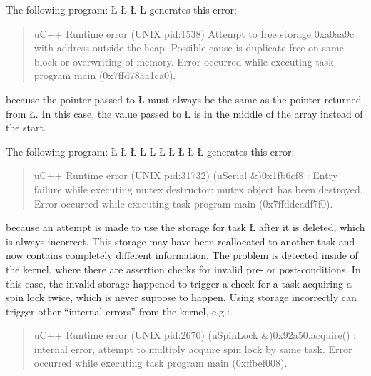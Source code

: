 \documentclass[openright,twoside]{report}
\begin{document}
The following program:
\LGinlinefalse\LGbegin\lgrinde
\L{}
\L{\LB{}}
\L{\LB{}}
\CE{}\L{\LB{\}}}
\endlgrinde\LGend
generates this error:
\begin{quote}
\BGfont
uC++ Runtime error (UNIX pid:1538) Attempt to free storage 0xa0aa9c with address outside the heap.
Possible cause is duplicate free on same block or overwriting of memory.
Error occurred while executing task program main (0x7ffd78aa1ca0).
\end{quote}
because the pointer passed to \LGinlinetrue\LGbegin\lgrinde\L{}\endlgrinde\LGend{} must always be the same as the pointer returned from \LGinlinetrue\LGbegin\lgrinde\L{}\endlgrinde\LGend{}.
In this case, the value passed to \LGinlinetrue\LGbegin\lgrinde\L{}\endlgrinde\LGend{} is in the middle of the array instead of the start.

The following program:
\LGinlinefalse\LGbegin\lgrinde
\L{}
\L{\LB{}}
\L{}
\L{\LB{}}
\L{\LB{\};}}
\L{}
\L{\LB{}}
\L{\LB{}}
\L{\LB{}}
\CE{}\L{\LB{\}}}
\endlgrinde\LGend
generates this error:
\begin{quote}
\BGfont
uC++ Runtime error (UNIX pid:31732) (uSerial \&)0x1fb6cf8 : Entry failure while executing mutex destructor: mutex object has been destroyed.
Error occurred while executing task program main (0x7ffddcadf7f0).
\end{quote}
because an attempt is made to use the storage for task \LGinlinetrue\LGbegin\lgrinde\L{}\endlgrinde\LGend{} after it is deleted, which is always incorrect.
This storage may have been reallocated to another task and now contains completely different information.
The problem is detected inside of the \uC kernel, where there are assertion checks for invalid pre- or post-conditions.
In this case, the invalid storage happened to trigger a check for a task acquiring a spin lock twice, which is never suppose to happen.
Using storage incorrectly can trigger other ``internal errors'' from the \uC kernel, e.g.:
\begin{quote}
\BGfont
uC++ Runtime error (UNIX pid:2670) (uSpinLock \&)0x92a50.acquire() : internal error, attempt to multiply acquire spin lock by same task.
Error occurred while executing task program main (0xffbef008).
\end{quote}
\end{document}
